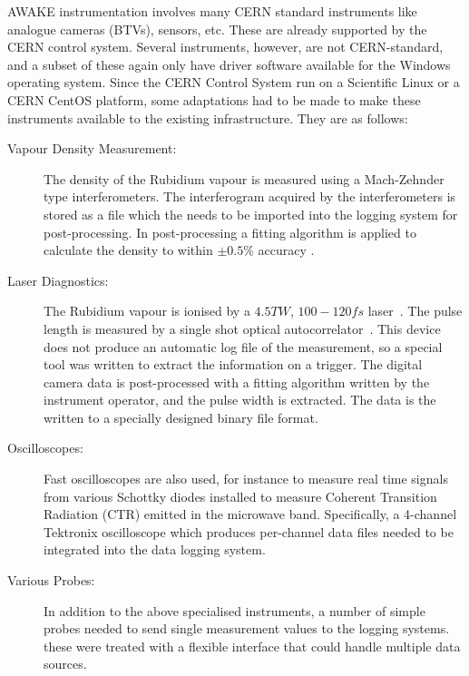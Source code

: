 AWAKE instrumentation involves many CERN standard instruments like analogue cameras (BTVs), sensors, etc.
These are already supported by the CERN control system.
Several instruments, however, are not CERN-standard, and a subset of these again only have driver software available for the Windows operating system.
Since the CERN Control System run on a Scientific Linux or a CERN CentOS platform, some adaptations had to be made to make these instruments available to the existing infrastructure.
They are as follows:
\begin{description}
    \item[Vapour Density Measurement:]
    The density of the Rubidium vapour is measured using a Mach-Zehnder type interferometers.
    The interferogram acquired by the interferometers is stored as a file which the needs to be imported into the logging system for post-processing.
    In post-processing a fitting algorithm is applied to calculate the density to within $\pm0.5\%$ accuracy \cite{oz:2016}.
    
    \item[Laser Diagnostics:]
    The Rubidium vapour is ionised by a $4.5\unit{TW}$, $100-120\unit{fs}$ laser~\cite{gschwendtner:2016}.
    The pulse length is measured by a single shot optical autocorrelator~\cite{salin:1987}.
    This device does not produce an automatic log file of the measurement, so a special tool was written to extract the information on a trigger.
    The digital camera data is post-processed with a fitting algorithm written by the instrument operator, and the pulse width is extracted.
    The data is the written to a specially designed binary file format.
    
    \item[Oscilloscopes:]
    Fast oscilloscopes are also used, for instance to measure real time signals from various Schottky diodes installed to measure Coherent Transition Radiation (CTR) emitted in the microwave band.
    Specifically, a 4-channel Tektronix oscilloscope which produces per-channel data files needed to be integrated into the data logging system.
    
    \item[Various Probes:]
    In addition to the above specialised instruments, a number of simple probes needed to send single measurement values to the logging systems.
    these were treated with a flexible interface that could handle multiple data sources.
\end{description}

